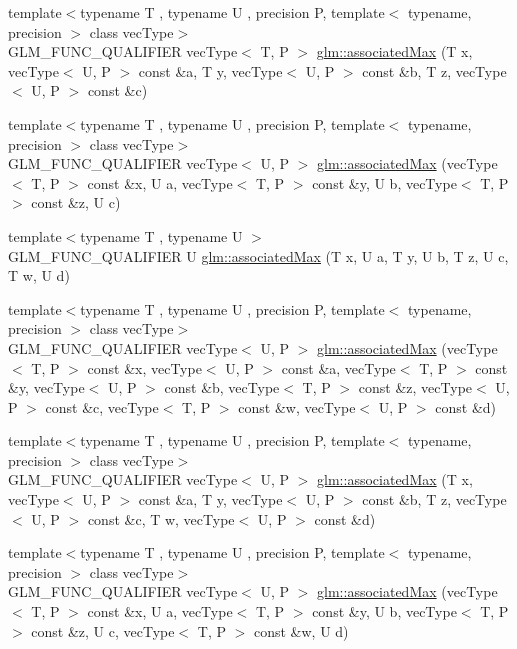 \begin{DoxyCompactItemize}
\item 
{\footnotesize template$<$typename T , typename U , precision P, template$<$ typename, precision $>$ class vec\-Type$>$ }\\G\-L\-M\-\_\-\-F\-U\-N\-C\-\_\-\-Q\-U\-A\-L\-I\-F\-I\-E\-R vec\-Type$<$ T, P $>$ \hyperlink{group__gtx__associated__min__max_ga553431a468e251623408603bcb51c9cb}{glm\-::associated\-Max} (T x, vec\-Type$<$ U, P $>$ const \&a, T y, vec\-Type$<$ U, P $>$ const \&b, T z, vec\-Type$<$ U, P $>$ const \&c)
\item 
{\footnotesize template$<$typename T , typename U , precision P, template$<$ typename, precision $>$ class vec\-Type$>$ }\\G\-L\-M\-\_\-\-F\-U\-N\-C\-\_\-\-Q\-U\-A\-L\-I\-F\-I\-E\-R vec\-Type$<$ U, P $>$ \hyperlink{group__gtx__associated__min__max_ga327136e6a568569c03a056f90814b656}{glm\-::associated\-Max} (vec\-Type$<$ T, P $>$ const \&x, U a, vec\-Type$<$ T, P $>$ const \&y, U b, vec\-Type$<$ T, P $>$ const \&z, U c)
\item 
{\footnotesize template$<$typename T , typename U $>$ }\\G\-L\-M\-\_\-\-F\-U\-N\-C\-\_\-\-Q\-U\-A\-L\-I\-F\-I\-E\-R U \hyperlink{group__gtx__associated__min__max_ga3038ffcb43eaa6af75897a99a5047ccc}{glm\-::associated\-Max} (T x, U a, T y, U b, T z, U c, T w, U d)
\item 
{\footnotesize template$<$typename T , typename U , precision P, template$<$ typename, precision $>$ class vec\-Type$>$ }\\G\-L\-M\-\_\-\-F\-U\-N\-C\-\_\-\-Q\-U\-A\-L\-I\-F\-I\-E\-R vec\-Type$<$ U, P $>$ \hyperlink{group__gtx__associated__min__max_gaf607886421c35cd7e4f41a50d7c330e3}{glm\-::associated\-Max} (vec\-Type$<$ T, P $>$ const \&x, vec\-Type$<$ U, P $>$ const \&a, vec\-Type$<$ T, P $>$ const \&y, vec\-Type$<$ U, P $>$ const \&b, vec\-Type$<$ T, P $>$ const \&z, vec\-Type$<$ U, P $>$ const \&c, vec\-Type$<$ T, P $>$ const \&w, vec\-Type$<$ U, P $>$ const \&d)
\item 
{\footnotesize template$<$typename T , typename U , precision P, template$<$ typename, precision $>$ class vec\-Type$>$ }\\G\-L\-M\-\_\-\-F\-U\-N\-C\-\_\-\-Q\-U\-A\-L\-I\-F\-I\-E\-R vec\-Type$<$ U, P $>$ \hyperlink{group__gtx__associated__min__max_ga7a165de1af9a3f9193516a3b47407086}{glm\-::associated\-Max} (T x, vec\-Type$<$ U, P $>$ const \&a, T y, vec\-Type$<$ U, P $>$ const \&b, T z, vec\-Type$<$ U, P $>$ const \&c, T w, vec\-Type$<$ U, P $>$ const \&d)
\item 
{\footnotesize template$<$typename T , typename U , precision P, template$<$ typename, precision $>$ class vec\-Type$>$ }\\G\-L\-M\-\_\-\-F\-U\-N\-C\-\_\-\-Q\-U\-A\-L\-I\-F\-I\-E\-R vec\-Type$<$ U, P $>$ \hyperlink{group__gtx__associated__min__max_ga3122fbe8133ea54749b10fb93e8a167e}{glm\-::associated\-Max} (vec\-Type$<$ T, P $>$ const \&x, U a, vec\-Type$<$ T, P $>$ const \&y, U b, vec\-Type$<$ T, P $>$ const \&z, U c, vec\-Type$<$ T, P $>$ const \&w, U d)
\end{DoxyCompactItemize}


